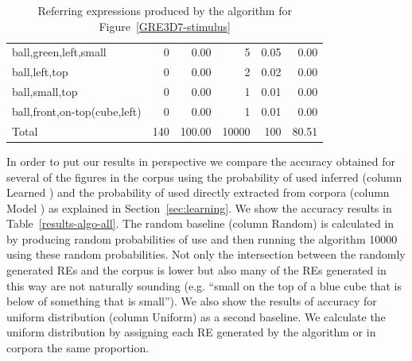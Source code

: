 \begin{table}[h!]
\begin{center}
\begin{tabular}{|l|r|r|r|r|r|}
ball,green,left,small                         &  0 &  0.00 &    5 &  0.05 &  0.00\\
ball,left,top                                 &  0 &  0.00 &    2 &  0.02 &  0.00\\
ball,small,top                                &  0 &  0.00 &    1 &  0.01 &  0.00\\
ball,front,on-top(cube,left)                  &  0 &  0.00 &    1 &  0.01 &  0.00\\
\hline
Total & 140 & 100.00 & 10000 & 100 & 80.51 \\
\hline
\end{tabular}
\caption{Referring expressions produced by the algorithm for Figure~\ref{GRE3D7-stimulus}\label{results-algo-fig3}}
\end{center}
\end{table}

In order to put our results in perspective we compare the accuracy obtained for several of the figures in the corpus using the probability of used inferred (column Learned \puse) and the probability of used directly extracted from corpora (column Model \puse) as explained in Section~\ref{sec:learning}. We show the accuracy results in Table~\ref{results-algo-all}. The random baseline (column Random) is calculated in by producing random probabilities of use and then running the algorithm 10000 using these random probabilities. Not only the intersection between the randomly generated REs and the corpus is lower but also many of  the REs generated in this way are not naturally sounding (e.g. ``small on the top of a blue cube that is below of something that is small''). We also show the results of accuracy for uniform distribution (column Uniform) as a second baseline. We calculate the uniform distribution by assigning each RE generated by the algorithm or in corpora the same proportion. 

